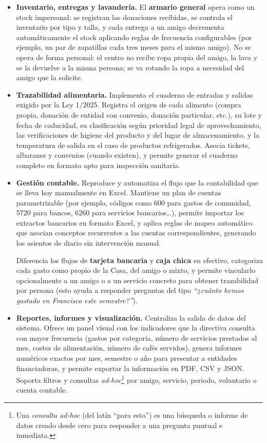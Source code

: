 \begin{itemize}
    \item \textbf{Inventario, entregas y lavandería.} El \textbf{armario general} opera como un stock
    impersonal: se registran las donaciones recibidas, se controla el inventario
    por tipo y talla, y cada entrega a un amigo decrementa automáticamente el
    stock aplicando reglas de frecuencia configurables (por ejemplo, un par de
    zapatillas cada tres meses para el mismo amigo). No se opera de forma personal: el centro no recibe ropa 
    propia del amigo, la lava y se la devuelve a la misma persona; se va rotando la ropa a necesidad del amigo que la solicite.

    \item \textbf{Trazabilidad alimentaria.} Implementa el cuaderno de entradas y salidas
    exigido por la Ley 1/2025. Registra el origen de cada alimento (compra
    propia, donación de entidad con convenio, donación particular, etc.), su lote y
    fecha de caducidad, su clasificación según prioridad legal de
    aprovechamiento, las verificaciones de higiene del producto y del lugar de
    almacenamiento, y la temperatura de salida en el caso de productos
    refrigerados. Asocia tickets, albaranes y convenios (cuando existen), y permite
    generar el cuaderno completo en formato apto para inspección sanitaria.

    \item \textbf{Gestión contable.} Reproduce y automatiza el flujo que la contabilidad 
    que se lleva hoy manualmente en Excel. Mantiene un plan de cuentas
    parametrizable (por ejemplo, códigos como 600 para gastos de comunidad, 5720 para bancos,
    6260 para servicios bancarios\ldots), permite importar los extractos bancarios en formato Excel, 
    y aplica reglas de mapeo automático que
    asocian conceptos recurrentes a las cuentas correspondientes, generando los asientos de diario sin intervención
    manual. 
    \par
    Diferencia los flujos de \textbf{tarjeta bancaria} y \textbf{caja chica} en
    efectivo, categoriza cada gasto como propio de la Casa, del amigo o mixto, y
    permite vincularlo opcionalmente a un amigo o a un servicio concreto para
    obtener trazabilidad por persona (esto ayuda a responder preguntas del tipo \textit{``¿cuánto hemos gastado en Francisco este
    semestre?''}). %

    \item \textbf{Reportes, informes y visualización.} Centraliza la salida de datos del
    sistema. Ofrece un panel visual con los indicadores que la directiva consulta
    con mayor frecuencia (gastos por categoría, número de servicios prestados al
    mes, costes de alimentación, número de cafés servidos), genera informes
    numéricos exactos por mes, semestre o año para
    presentar a entidades financiadoras, y permite exportar la información en
    PDF, CSV y JSON. Soporta filtros y consultas \textit{ad-hoc}\footnote{Una \textit{consulta ad-hoc} (del latín ``para esto'') es una búsqueda o informe de datos creado desde cero para responder a una pregunta puntual e inmediata.} por amigo, servicio, %
    periodo, voluntario o cuenta contable.


\end{itemize}
